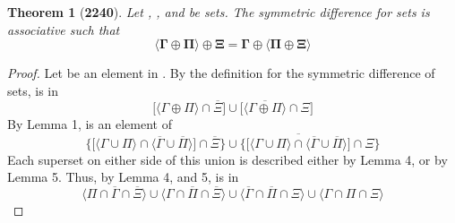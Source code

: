 \documentclass[preview]{standalone}
\newtheorem{theorem}{Theorem}
\begin{document}
\begin{theorem}[\textbf{2240}]
    Let \bm{$\Gamma$}, \bm{$\Pi$}, and \bm{$\Xi$} be sets. 
    The symmetric difference for sets is associative such that 
    \begin{equation*}
        \bm{
            \Big \langle \Gamma \oplus \Pi \Big \rangle
                \oplus 
            \Xi 
                = 
            \Gamma 
                \oplus 
            \Big \langle \Pi \oplus \Xi \Big \rangle
        }
    \end{equation*}
\end{theorem}
\begin{proof}
    Let \bm{$\zeta$} be an element in 
    \bm{$
        \big \langle \Gamma \oplus \Pi \big \rangle
            \oplus 
        \Xi 
    $}. 
    By the definition for the symmetric 
    difference of sets, \bm{$\zeta$} is in
    \begin{equation*}
        \bigg[
            \Big \langle \Gamma \oplus \Pi \Big \rangle
                \cap
            \overline{\Xi}
        \bigg]
            \cup
        \bigg[
            \Big \langle \overline{
                \Gamma \oplus \Pi
            } \Big \rangle 
                \cap
            \Xi
        \bigg]
    \end{equation*}
    By Lemma 1, \bm{$\zeta$} is an element of
    \begin{equation*}
        \Bigg\{
            \bigg[
                \Big \langle \Gamma \cup \Pi \Big \rangle
                    \cap
                \Big \langle \overline{\Gamma} \cup \overline{\Pi} \Big \rangle
            \bigg]
                \cap
            \overline{\Xi}
        \Bigg\}
            \cup
        \Bigg\{
            \bigg[ \overline{
                \Big \langle \Gamma \cup \Pi \Big \rangle
                \cap
            \Big \langle \overline{\Gamma} \cup \overline{\Pi} \Big \rangle
            } \bigg]
                \cap
            \Xi
        \Bigg\}
    \end{equation*}
    Each superset on either side of this union is described either by Lemma 4,
    or by Lemma 5. Thus, by Lemma 4, and 5, \bm{$\zeta$} is in
    \begin{equation*}
        \Big \langle \Pi \cap \overline{\Gamma} \cap \overline{\Xi} \Big \rangle
            \cup
        \Big \langle \Gamma \cap \overline{\Pi} \cap \overline{\Xi} \Big \rangle
            \cup
        \Big \langle \overline{\Gamma} \cap \overline{\Pi} \cap \Xi \Big \rangle
            \cup
        \Big \langle \Gamma \cap \Pi \cap \Xi \Big \rangle

\end{equation*}
\end{proof}
\end{document}
